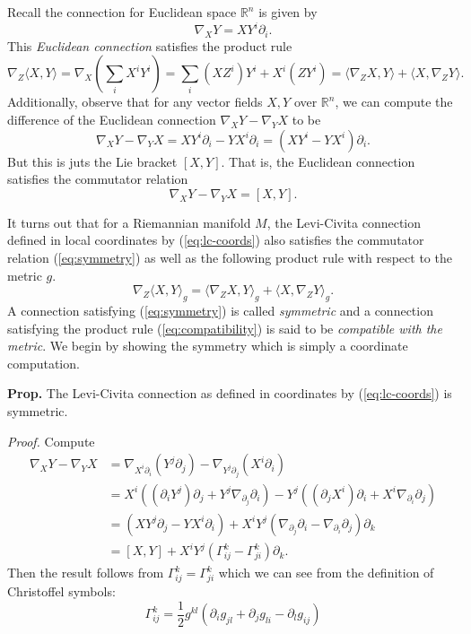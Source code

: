 \documentclass[
]{article}
\begin{document}
Recall the connection for Euclidean space \(\mathbb{R}^n\) is given by
\[
    \nabla_{X}Y = XY^i\partial_i.
\] This \emph{Euclidean connection} satisfies the product rule \[
    \nabla_{Z}\langle X , Y\rangle
    = \nabla_{X} \left(\sum_{i}X^iY^i\right)
    = \sum_{i}(XZ^i)Y^i + X^i(ZY^i)
    = \langle \nabla_Z X , Y\rangle + \langle X , \nabla_ZY\rangle.
\] Additionally, observe that for any vector fields \(X,Y\) over
\(\mathbb{R}^n\), we can compute the difference of the Euclidean
connection \(\nabla_X Y - \nabla_Y X\) to be \[
   \nabla_X Y - \nabla_Y X
   = XY^i\partial_i - YX^i\partial_i
   = (XY^i - YX^i) \partial_i. 
\] But this is juts the Lie bracket \([X,Y]\). That is, the Euclidean
connection satisfies the commutator relation \[
    \nabla_X Y - \nabla_Y X = [X,Y].
    \tag{S}
    \label{eq:symmetry}
\]

It turns out that for a Riemannian manifold \(M\), the Levi-Civita
connection defined in local coordinates by (\ref{eq:lc-coords}) also
satisfies the commutator relation (\ref{eq:symmetry}) as well as the
following product rule with respect to the metric \(g\). \[
    \nabla_Z\langle X , Y\rangle_g = \langle \nabla_Z X , Y\rangle_g + \langle X , \nabla_Z Y\rangle_g.
    \tag{M}
    \label{eq:compatibility}
\] A connection satisfying (\ref{eq:symmetry}) is called
\emph{symmetric} and a connection satisfying the product rule
(\ref{eq:compatibility}) is said to be \emph{compatible with the
metric}. We begin by showing the symmetry which is simply a coordinate
computation.

\textbf{Prop.} The Levi-Civita connection as defined in coordinates by
(\ref{eq:lc-coords}) is symmetric.

\emph{Proof.} Compute \begin{align}
    \nabla_X Y - \nabla_Y X
    &= \nabla_{X^i \partial_i}(Y^j \partial_j) - \nabla_{Y^j\partial_j}(X^i \partial_i)\\\
    &= X^i((\partial_iY^j)\partial_j + Y^j \nabla_{\partial_j}\partial_i)
    -  Y^j((\partial_jX^i)\partial_i + X^i \nabla_{\partial_i}\partial_j)\\\
    &= (XY^j\partial_j - YX^i\partial_i) + X^iY^j(\nabla_{\partial_j}\partial_i - \nabla_{\partial_i}\partial_j)\partial_k\\\
    &= [X,Y] + X^iY^j(\Gamma_{ij}^k - \Gamma_{ji}^k)\partial_k.
\end{align} Then the result follows from
\(\Gamma_{ij}^k = \Gamma_{ji}^k\) which we can see from the definition
of Christoffel symbols: \[
    \Gamma_{ij}^k = \frac{1}{2}g^{kl}(\partial_ig_{jl} + \partial_jg_{li} - \partial_lg_{ij})
\]
\end{document}

